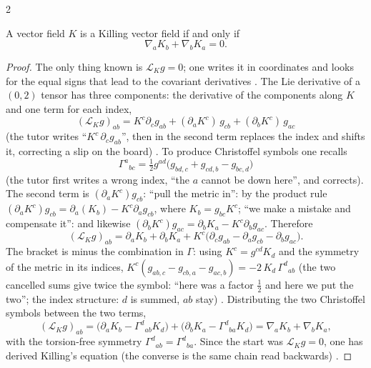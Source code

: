 \begin{paracol}{2}
\begin{proposition}\label{prop:c21-killing}
A vector field $K$ is a Killing vector field if and only if
\[
  \nabla_aK_b+\nabla_bK_a=0 .
\]
\end{proposition}
\begin{proof}
The only thing known is $\mathcal L_Kg=0$; one writes it in coordinates and looks for the equal signs that lead to the covariant derivatives . The Lie derivative of a $(0,2)$ tensor has three components: the derivative of the components along $K$ and one term for each index,
\[
  (\mathcal L_Kg)_{ab}=K^c\partial_cg_{ab}+(\partial_aK^c)\,g_{cb}+(\partial_bK^c)\,g_{ac}
\]
(the tutor writes ``$K^c\,\partial_c g_{ab}$'', then in the second term replaces the index and shifts it, correcting a slip on the board) .
To produce Christoffel symbols one recalls
\[
  \Gamma^a{}_{bc}=\tfrac12g^{ad}\bigl(g_{bd,c}+g_{cd,b}-g_{bc,d}\bigr)
\]
(the tutor first writes a wrong index, ``the $a$ cannot be down here'', and corrects). The second term is $(\partial_aK^c)g_{cb}$: ``pull the metric in'': by the product rule $(\partial_aK^c)g_{cb}=\partial_a(K_b)-K^c\partial_ag_{cb}$, where $K_b=g_{bc}K^c$; ``we make a mistake and compensate it'': and likewise $(\partial_bK^c)g_{ac}=\partial_bK_a-K^c\partial_bg_{ac}$. Therefore
\[
  (\mathcal L_Kg)_{ab}=\partial_aK_b+\partial_bK_a+K^c\bigl(\partial_cg_{ab}-\partial_ag_{cb}-\partial_bg_{ac}\bigr).
\]
The bracket is minus the combination in $\Gamma$: using $K^c=g^{cd}K_d$ and the symmetry of the metric in its indices, $K^c(g_{ab,c}-g_{cb,a}-g_{ac,b})=-2\,K_d\,\Gamma^d{}_{ab}$ (the two cancelled sums give twice the symbol: ``here was a factor $\tfrac12$ and here we put the two''; the index structure: $d$ is summed, $ab$ stay) . Distributing the two Christoffel symbols between the two terms,
\[
  (\mathcal L_Kg)_{ab}=\bigl(\partial_aK_b-\Gamma^d{}_{ab}K_d\bigr)+\bigl(\partial_bK_a-\Gamma^d{}_{ba}K_d\bigr)=\nabla_aK_b+\nabla_bK_a,
\]
with the torsion-free symmetry $\Gamma^d{}_{ab}=\Gamma^d{}_{ba}$. Since the start was $\mathcal L_Kg=0$, one has derived Killing's equation (the converse is the same chain read backwards) .
\end{proof}


\end{paracol}
